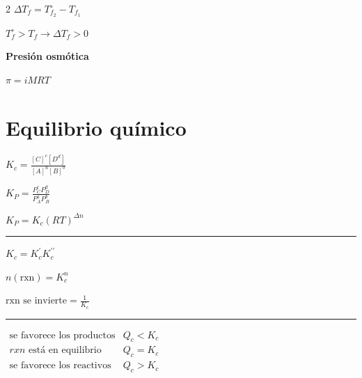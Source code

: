 \begin {multicols}{2}
\({\Delta}T_f=T_{f_2}^\circ-T_{f_1}\)

\(T_f^\circ>T_f→{\Delta}T_f>0\)

\textbf{Presión osmótica}

\(\pi=iMRT\)

\hypertarget{equilibrio-quuxedmico}{%
\section{Equilibrio químico}\label{equilibrio-quuxedmico}}

\(K_c=\frac{[C]^c[D^d]}{[A]^a[B]^b}\)

\(K_P=\frac{P_C^cP_D^d}{P_A^aP_B^b}\)

\(K_P=K_c(RT)^{{\Delta}n}\)

\begin{center}\rule{0.5\linewidth}{0.5pt}\end{center}

\(K_c=K_c^{\prime}K_c^{\prime\prime}\)

\(n(\text{rxn})=K_c^n\)

\(\text{rxn se invierte}=\frac{1}{K_c}\)

\begin{center}\rule{0.5\linewidth}{0.5pt}\end{center}

\(\begin{matrix} \text{se favorece los productos} & Q_c<K_c \\ rxn\text{ está en equilibrio} & Q_c=K_c \\ \text{se favorece los reactivos} & Q_c>K_c \end{matrix}\)

\end {multicols}
